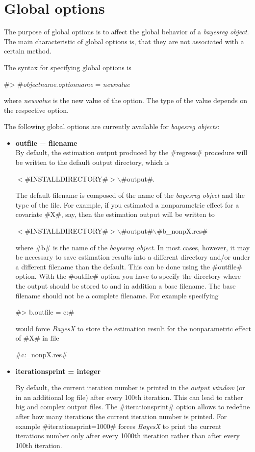 \section{Global options}
\label{bayesregglobopt} 

The purpose of global options is to affect the global behavior of
a {\em bayesreg object}. The main characteristic of global options
is, that they are not associated with a certain method.

The syntax for specifying global options is

#> #{\em objectname}.{\em optionname} = {\em newvalue}

where {\em newvalue} is the new value of the option. The type of
the value depends on the respective option.

The following global options are currently available for {\em
bayesreg objects}:

\begin{itemize}
\item {\bf outfile = filename} \\
By default, the estimation output produced by the #regress#
procedure will be written to the default output directory, which
is

$<$#INSTALLDIRECTORY#$>$$\backslash$#output#.

The default filename is composed of the name of the {\em bayesreg
object} and the type of the file. For example, if you estimated a
nonparametric effect for a covariate #X#, say, then the estimation
output will be written to

$<$#INSTALLDIRECTORY#$>$$\backslash$#output#$\backslash$#b_nonpX.res#

where #b# is the name of the {\em bayesreg object}. In most cases,
however, it may be necessary to save estimation results into a
different directory and/or under a different filename than the
default. This can be done using the #outfile# option. With the
#outfile# option you have to specify the directory where the
output should be stored to and in addition a base filename. The
base filename should not be a complete filename. For example
specifying

#> b.outfile = c:\data\res#

would force {\em BayesX} to store the estimation result for the
nonparametric effect of #X# in file

#c:\data\res_nonpX.res#

\item {\bf iterationsprint = integer}

By default, the current iteration number is printed in the {\em
output window} (or in an additional log file) after every 100th
iteration. This can lead to rather big and complex output files.
The #iterationsprint# option allows to redefine after how many
iterations the current iteration number is printed. For example
#iterationsprint=1000# forces {\em BayesX} to print the current
iterations number only after every 1000th iteration rather than
after every 100th iteration.
\end{itemize}



